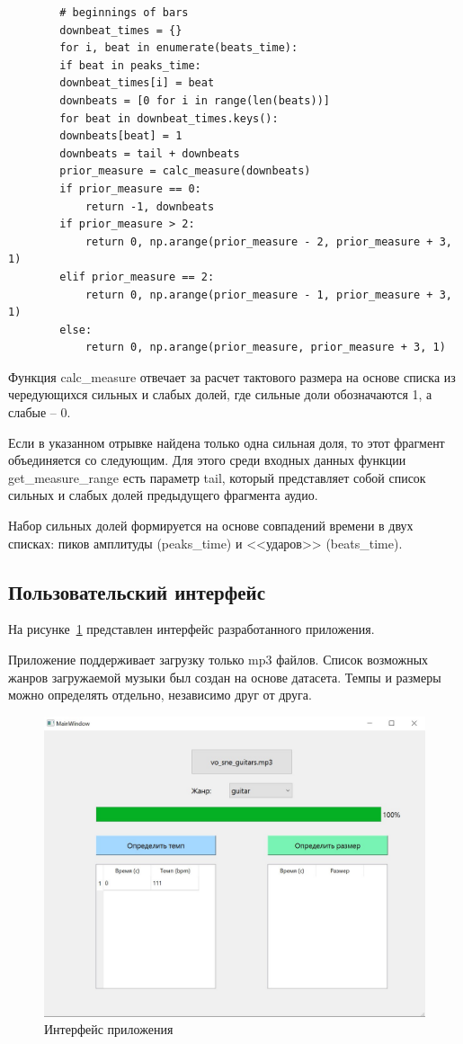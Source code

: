 \begin{lstlisting}
		# beginnings of bars
		downbeat_times = {}
		for i, beat in enumerate(beats_time):
		if beat in peaks_time:
		downbeat_times[i] = beat
		downbeats = [0 for i in range(len(beats))]
		for beat in downbeat_times.keys():
		downbeats[beat] = 1
		downbeats = tail + downbeats
		prior_measure = calc_measure(downbeats)
		if prior_measure == 0:
			return -1, downbeats
		if prior_measure > 2:
			return 0, np.arange(prior_measure - 2, prior_measure + 3, 1)
		elif prior_measure == 2:
			return 0, np.arange(prior_measure - 1, prior_measure + 3, 1)
		else:
			return 0, np.arange(prior_measure, prior_measure + 3, 1)
\end{lstlisting}

Функция calc\_measure отвечает за расчет тактового размера на основе списка из чередующихся сильных и слабых долей, где сильные доли обозначаются 1, а слабые -- 0.

Если в указанном отрывке найдена только одна сильная доля, то этот фрагмент объединяется со следующим. Для этого среди входных данных функции get\_measure\_range есть параметр tail, который представляет собой список сильных и слабых долей предыдущего фрагмента аудио.

Набор сильных долей формируется на основе совпадений времени в двух списках: пиков амплитуды (peaks\_time) и <<ударов>> (beats\_time).

\subsection{Пользовательский интерфейс}

На рисунке~\ref{img:gui} представлен интерфейс разработанного приложения.

Приложение поддерживает загрузку только mp3 файлов. Список возможных жанров загружаемой музыки был создан на основе датасета. Темпы и размеры можно определять отдельно, независимо друг от друга.

\begin{figure}[h]
	\centering
	\includegraphics[scale=0.7]{inc/img/gui.jpg}
	\caption{Интерфейс приложения}
	\label{img:gui}
\end{figure}

